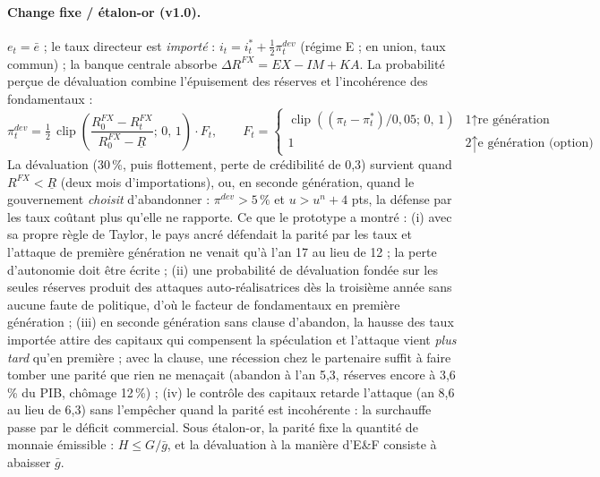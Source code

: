 \documentclass[11pt,a4paper]{article}
\newcommand{\up}{$\uparrow$}
\newcommand{\clip}[3]{\operatorname{clip}\!\left(#1;\,#2,\,#3\right)}
\begin{document}
\paragraph{Change fixe / étalon-or (v1.0).} $e_t=\bar e$ ; le taux directeur est \emph{importé} : $i_t = i^\ast_t + \tfrac12\pi^{dev}_t$ (régime E ; en union, taux commun) ; la banque centrale absorbe $\Delta R^{FX}=EX-IM+KA$. La probabilité perçue de dévaluation combine l'épuisement des réserves et l'incohérence des fondamentaux :
\begin{equation}
\pi^{dev}_t = \tfrac12\,\clip{\frac{R^{FX}_0 - R^{FX}_t}{R^{FX}_0 - \underline R}}{0}{1}\cdot F_t, \qquad
F_t = \begin{cases} \clip{(\pi_t-\pi^\ast_t)/0{,}05}{0}{1} & \text{1\up{re} génération}\\ 1 & \text{2\up{e} génération (option)} \end{cases}
\label{eq:pdev}
\end{equation}
La dévaluation (30\,\%, puis flottement, perte de crédibilité de 0,3) survient quand $R^{FX}<\underline R$ (deux mois d'importations), ou, en seconde génération, quand le gouvernement \emph{choisit} d'abandonner : $\pi^{dev}>5\,\%$ et $u>u^n+4$ pts, la défense par les taux coûtant plus qu'elle ne rapporte. Ce que le prototype a montré : (i) avec sa propre règle de Taylor, le pays ancré défendait la parité par les taux et l'attaque de première génération ne venait qu'à l'an 17 au lieu de 12 ; la perte d'autonomie doit être écrite ; (ii) une probabilité de dévaluation fondée sur les seules réserves produit des attaques auto-réalisatrices dès la troisième année sans aucune faute de politique, d'où le facteur de fondamentaux en première génération ; (iii) en seconde génération sans clause d'abandon, la hausse des taux importée attire des capitaux qui compensent la spéculation et l'attaque vient \emph{plus tard} qu'en première ; avec la clause, une récession chez le partenaire suffit à faire tomber une parité que rien ne menaçait (abandon à l'an 5,3, réserves encore à 3,6\,\% du PIB, chômage 12\,\%) ; (iv) le contrôle des capitaux retarde l'attaque (an 8,6 au lieu de 6,3) sans l'empêcher quand la parité est incohérente : la surchauffe passe par le déficit commercial. Sous étalon-or, la parité fixe la quantité de monnaie émissible : $H\le G/\bar g$, et la dévaluation à la manière d'E\&F consiste à abaisser $\bar g$.
\end{document}
